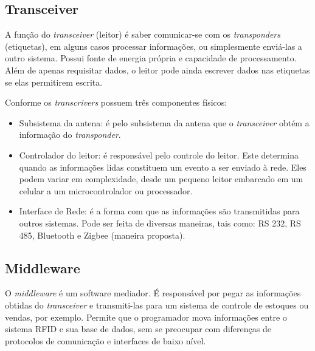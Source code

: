 \documentclass[tcc,capa]{texufpel}
\begin{document}
        \subsection{Transceiver}
        
            A função do \textit{transceiver} (leitor) é saber comunicar-se com os \textit{transponders} (etiquetas), em alguns casos processar informações, ou simplesmente enviá-las a outro sistema.
            Possui fonte de energia própria e capacidade de processamento. Além de apenas requisitar dados, o leitor pode ainda escrever dados nas etiquetas se elas permitirem escrita.
            
            Conforme \cite{bernardo2004tecnologia} os \textit{transcrivers} possuem três componentes físicos:
            
             \begin{itemize}
             
                 \item Subsistema da antena: é pelo subsistema da antena que o \textit{transceiver} obtém a informação do \textit{transponder}.
             
                 \item Controlador do leitor: é responsável pelo controle do leitor. Este determina quando as informações lidas constituem um evento a ser enviado à rede. Eles podem variar em complexidade, desde um pequeno leitor embarcado em um celular a um microcontrolador ou processador.
              
                 \item Interface de Rede: é a forma com que as informações são transmitidas para outros sistemas. Pode ser feita de diversas maneiras, tais como: RS 232, RS 485, Bluetooth e Zigbee (maneira proposta).
                 
             \end{itemize}
        
        
        \subsection{Middleware}
        
            O \textit{middleware} é um software mediador. É responsável por pegar as informações obtidas do \textit{transceiver} e transmiti-las para um sistema de controle de estoques ou vendas, por exemplo. Permite que o programador mova informações entre o sistema RFID e sua base de dados, sem se preocupar com diferenças de protocolos de comunicação e interfaces de baixo nível.
        
\end{document}
